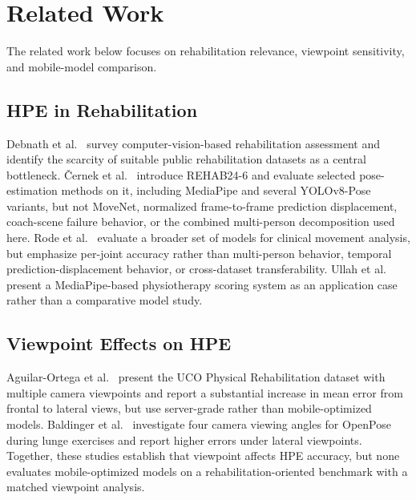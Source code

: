 \section{Related Work}
\label{sec:related-work}

The related work below focuses on rehabilitation relevance, viewpoint sensitivity, and mobile-model comparison.

\subsection{HPE in Rehabilitation}
\label{sec:rw-rehabilitation}

Debnath et al.~\cite{debnath2022review} survey computer-vision-based rehabilitation assessment and identify the scarcity of suitable public rehabilitation datasets as a central bottleneck. \v{C}ernek et al.~\cite{cernek2025rehab246} introduce REHAB24-6 and evaluate selected pose-estimation methods on it, including MediaPipe and several YOLOv8-Pose variants, but not MoveNet, normalized frame-to-frame prediction displacement, coach-scene failure behavior, or the combined multi-person decomposition used here. Rode et al.~\cite{rode2025assessment} evaluate a broader set of models for clinical movement analysis, but emphasize per-joint accuracy rather than multi-person behavior, temporal prediction-displacement behavior, or cross-dataset transferability. Ullah et al.~\cite{ullah2025realtime} present a MediaPipe-based physiotherapy scoring system as an application case rather than a comparative model study.


\subsection{Viewpoint Effects on HPE}
\label{sec:rw-viewpoint}

Aguilar-Ortega et al.~\cite{aguilarortega2023uco} present the UCO Physical Rehabilitation dataset with multiple camera viewpoints and report a substantial increase in mean error from frontal to lateral views, but use server-grade rather than mobile-optimized models. Baldinger et al.~\cite{baldinger2025viewing} investigate four camera viewing angles for OpenPose during lunge exercises and report higher errors under lateral viewpoints. Together, these studies establish that viewpoint affects HPE accuracy, but none evaluates mobile-optimized models on a rehabilitation-oriented benchmark with a matched viewpoint analysis.


